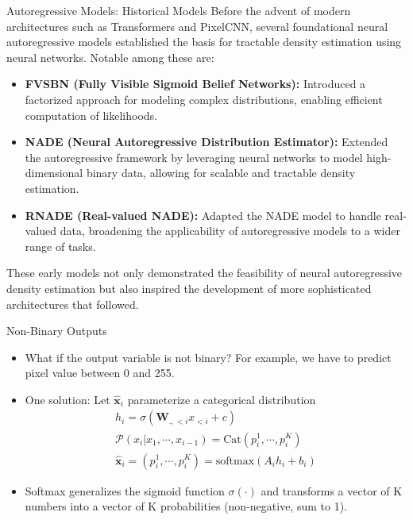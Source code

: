 \begin{frame}[allowframebreaks]{Autoregressive Models: Historical Models}
    Before the advent of modern architectures such as Transformers and PixelCNN, several foundational neural autoregressive models established the basis for tractable density estimation using neural networks. Notable among these are:
    \small
    \begin{itemize}
        \item \textbf{FVSBN (Fully Visible Sigmoid Belief Networks):} Introduced a factorized approach for modeling complex distributions, enabling efficient computation of likelihoods.
        \item \textbf{NADE (Neural Autoregressive Distribution Estimator):} Extended the autoregressive framework by leveraging neural networks to model high-dimensional binary data, allowing for scalable and tractable density estimation.
        \item \textbf{RNADE (Real-valued NADE):} Adapted the NADE model to handle real-valued data, broadening the applicability of autoregressive models to a wider range of tasks.
    \end{itemize}
    \normalsize
    These early models not only demonstrated the feasibility of neural autoregressive density estimation but also inspired the development of more sophisticated architectures that followed.
\end{frame}




\begin{frame}{Non-Binary Outputs}
    \begin{itemize}
        \item What if the output variable is not binary? For example, we have to predict pixel value between 0 and 255.
        \item One solution: Let $\mathbf{\hat{x}}_i$ parameterize a categorical distribution
        \begin{align}
            h_i = \sigma(\mathbf{W}_{.,<i} x_{<i} + c)\\
            \mathcal{P}(x_i | x_1, \cdots, x_{i-1}) = \text{Cat}(p_i^1, \cdots, p_i^K)\\
            \mathbf{\hat{x}}_i = (p_i^1, \cdots, p_i^K) = \text{softmax} (A_i h_i + b_i)
        \end{align}
        \item Softmax generalizes the sigmoid function $\sigma(\cdot)$ and transforms a vector of K numbers into a vector of K probabilities (non-negative, sum to 1).

    \end{itemize}
\end{frame}



